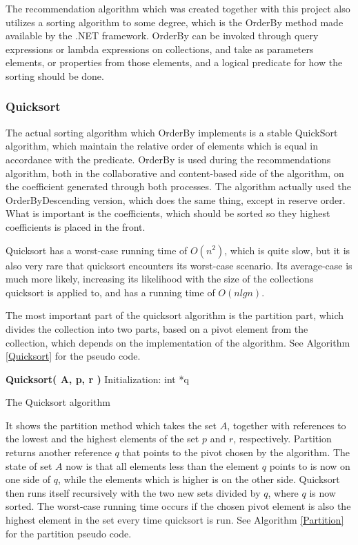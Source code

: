 The recommendation algorithm which was created together with this project also utilizes a sorting algorithm to some degree, which is the OrderBy method made available by the .NET framework. OrderBy can be invoked through query expressions or lambda expressions on collections, and take as parameters elements, or properties from those elements, and a logical predicate for how the sorting should be done. \cite{AlgoAnal1}

\subsubsection{Quicksort}

The actual sorting algorithm which OrderBy implements is a stable QuickSort algorithm, which maintain the relative order of elements which is equal in accordance with the predicate. OrderBy is used during the recommendations algorithm, both in the collaborative and content-based side of the algorithm, on the coefficient generated through both processes. The algorithm actually used the OrderByDescending version, which does the same thing, except in reserve order. What is important is the coefficients, which should be sorted so they highest coefficients is placed in the front.

Quicksort has a worst-case running time of $O(n^2)$, which is quite slow, but it is also very rare that quicksort encounters its worst-case scenario. Its average-case is much more likely, increasing its likelihood with the size of the collections quicksort is applied to, and has a running time of $O(nlgn)$.

The most important part of the quicksort algorithm is the partition part, which divides the collection into two parts, based on a pivot element from the collection, which depends on the implementation of the algorithm. See Algorithm \ref{Quicksort} for the pseudo code.

\begin{algorithm}
	\DontPrintSemicolon
	\textbf{Quicksort( A, p, r )}\;
	Initialization:\;
	int *q\;
	\caption{The Quicksort algorithm}
	\label{Quicksort}
\end{algorithm}

It shows the partition method which takes the set $A$, together with references to the lowest and the highest elements of the set $p$ and $r$, respectively. Partition returns another reference $q$ that points to the pivot chosen by the algorithm. The state of set $A$ now is that all elements less than the element $q$ points to is now on one side of $q$, while the elements which is higher is on the other side. Quicksort then runs itself recursively with the two new sets divided by $q$, where $q$ is now sorted. The worst-case running time occurs if the chosen pivot element is also the highest element in the set every time quicksort is run. See Algorithm \ref{Partition} for the partition pseudo code.

